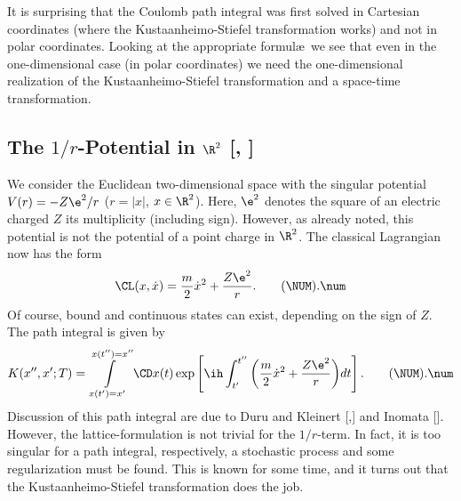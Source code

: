 It is surprising that the Coulomb path integral was first solved in
Cartesian coordinates (where the Kustaanheimo-Stiefel transformation
works) and not in polar coordinates. Looking at the appropriate
formul\ae\ we see that even in the one-dimensional case (in polar
coordinates) we need the one-dimensional realization of the
Kustaanheimo-Stiefel transformation and a space-time transformation.

\def\Kapitel{III.\NUM.1}
\def\Section{The $1/r$-potential in $\R^2$}
\subsection{The $1/r$-Potential in $\R^2$ [\DKb, \INOa]}
We consider the Euclidean two-dimensional space with the singular
potential $V(r)=-Z\e^2/r$ ($r=\vert x\vert $, $x\in\R^2$).
Here, $\e^2$ denotes the square of an electric charged $Z$ its
multiplicity (including sign). However, as already noted, this
potential is not the potential of a point charge in $\R^2$. The
classical Lagrangian now has the form
$$\CL(x,\dot x)={m\over2}\dot x^2+{Z\e^2\over r}.
  \tag\NUM.\num$$\plus%
Of course, bound and continuous states can exist, depending on the
sign of $Z$.
The path integral is given by
$$K(x'',x';T)=\int\limits_{x(t')=x'}^{x(t'')=x''} \CD x(t)
  \exp\left[\ih\int_{t'}^{t''}
            \bigg({m\over2}\dot x^2+{Z\e^2\over r}\bigg)dt\right].
  \tag\NUM.\num$$\edef\numFHbs{\NUM.\num}\plus%
Discussion of this path integral are due to Duru and Kleinert
[\DKa,\DKb] and Inomata [\INOb]. However, the lattice-formulation is not
trivial for the $1/r$-term. In fact, it is too singular for a path
integral, respectively, a stochastic process and some regularization
must be found. This is known for some time, and it turns out that the
Kustaanheimo-Stiefel transformation does the job.

